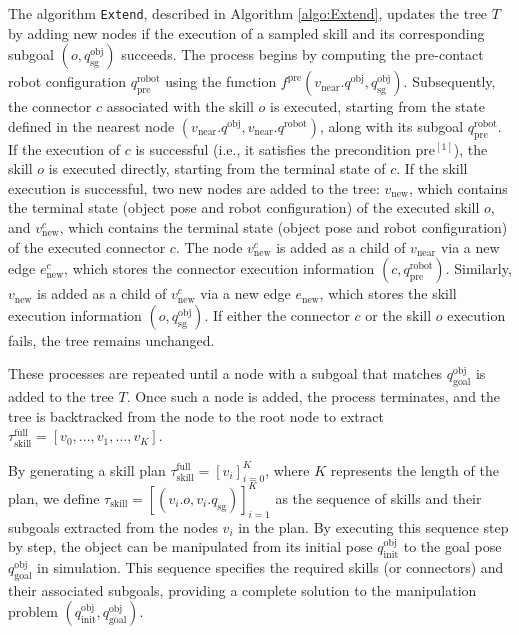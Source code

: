 The algorithm \texttt{Extend}, described in Algorithm \ref{algo:Extend}, updates the tree \( T \) by adding new nodes if the execution of a sampled skill and its corresponding subgoal \( (o, q^\text{obj}_\text{sg}) \) succeeds. The process begins by computing the pre-contact robot configuration \( q^{\text{robot}}_{\text{pre}} \) using the function \( f^\text{pre}(v_{\text{near}}.q^{\text{obj}}, q^{\text{obj}}_{\text{sg}}) \). Subsequently, the connector \( c \) associated with the skill \( o \) is executed, starting from the state defined in the nearest node \( (v_\text{near}.q^\text{obj}, v_\text{near}.q^\text{robot}) \), along with its subgoal \( q^\text{robot}_\text{pre} \). If the execution of \( c \) is successful (i.e., it satisfies the precondition \( \text{pre}^{[1]} \)), the skill \( o \) is executed directly, starting from the terminal state of \( c \). If the skill execution is successful, two new nodes are added to the tree: \( v_{\text{new}} \), which contains the terminal state (object pose and robot configuration) of the executed skill \( o \), and \( v^c_{\text{new}} \), which contains the terminal state (object pose and robot configuration) of the executed connector \( c \). The node \( v^c_{\text{new}} \) is added as a child of \( v_{\text{near}} \) via a new edge \( e^c_\text{new} \), which stores the connector execution information \( (c, q^{\text{robot}}_{\text{pre}}) \). Similarly, \( v_{\text{new}} \) is added as a child of \( v^c_{\text{new}} \) via a new edge \( e_\text{new} \), which stores the skill execution information \( (o, q^{\text{obj}}_{\text{sg}}) \). If either the connector \( c \) or the skill \( o \) execution fails, the tree remains unchanged.

These processes are repeated until a node with a subgoal that matches $q^\text{obj}_\text{goal}$ is added to the tree $T$. Once such a node is added, the process terminates, and the tree is backtracked from the node to the root node to extract $\tau^\text{full}_\text{skill}=[ v_0, ..., v_1, ..., v_K ]$.

By generating a skill plan \(\tau^\text{full}_\text{skill} = [v_i]_{i=0}^{K}\), where \( K \) represents the length of the plan, we define \(\tau_\text{skill} =[(v_i.o, v_i.q_\text{sg})]_{i=1}^K\) as the sequence of skills and their subgoals extracted from the nodes \( v_i \) in the plan. By executing this sequence step by step, the object can be manipulated from its initial pose \( q^\text{obj}_\text{init} \) to the goal pose \( q^\text{obj}_\text{goal} \) in simulation. This sequence specifies the required skills (or connectors) and their associated subgoals, providing a complete solution to the manipulation problem \( (q^\text{obj}_\text{init}, q^\text{obj}_\text{goal}) \).

